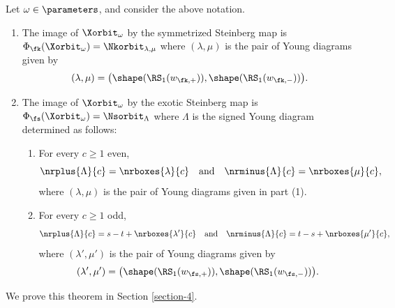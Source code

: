\begin{theorem}
\label{T2}
Let $\omega\in\parameters$, and consider the above notation.
\begin{enumerate}[label=(\arabic*)]
\item \label{it2vvt1}
The image of $\Xorbit_\omega$ by the symmetrized Steinberg map is  $\Phi_\fk(\Xorbit_\omega)=\Nkorbit_{\lambda,\mu}$ where $(\lambda,\mu)$ is the pair of Young diagrams given by
\[
(\lambda,\mu)=\big(
\shape(\RS_1(w_{\fk,+})),\shape(\RS_1(w_{\fk,-}))\big).
\]
\item \label{it2vvt2} The image of $\Xorbit_\omega$ by the exotic Steinberg map is $\Phi_\fs(\Xorbit_\omega)=\Nsorbit_\Lambda$ where $\Lambda$ is the signed Young diagram determined as follows:
\begin{enumerate}
\item For every $c\geq 1$ even,
\[
\nrplus{\Lambda}{c}=\nrboxes{\lambda}{c}\quad\mbox{and}\quad \nrminus{\Lambda}{c}=\nrboxes{\mu}{c},
\]
where $(\lambda,\mu)$ is the pair of Young diagrams given in part {\rm (1)}.
\item For every $c\geq 1$ odd,
\[
\nrplus{\Lambda}{c}=s-t+\nrboxes{\lambda'}{c}\quad\mbox{and}\quad \nrminus{\Lambda}{c}=t-s+\nrboxes{\mu'}{c},
\]
where $(\lambda',\mu')$ is the pair of Young diagrams given by
\[(\lambda',\mu')=\big(\shape(\RS_1(w_{\fs,+})),\shape(\RS_1(w_{\fs,-}))\big).\]
\end{enumerate}
\end{enumerate}
\end{theorem}

We prove this theorem in Section \ref{section-4}.
